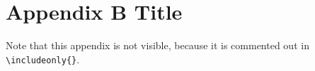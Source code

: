 \chapter{Appendix B Title}
\label{app:appB}

Note that this appendix is not visible, because it is commented out in \texttt{\textbackslash includeonly\{\}}.